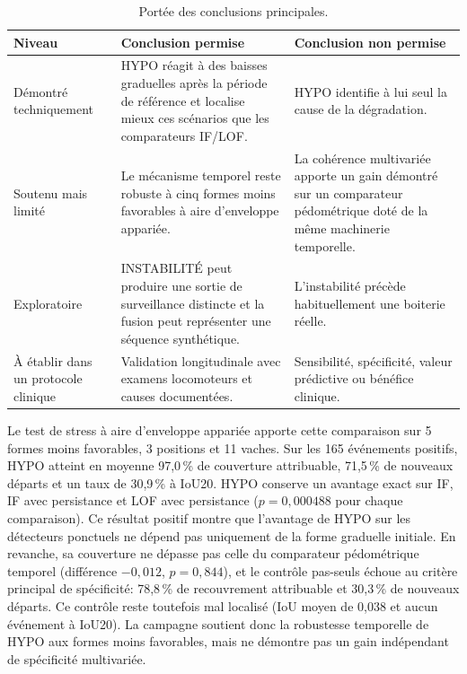 \begin{table}[H]
  \centering
  \caption{Portée des conclusions principales.}
  \label{tab:portee_conclusions}
  \small
  \begin{tabular}{p{}p{}p{}}
    \toprule
    Niveau & Conclusion permise & Conclusion non permise \\
    \midrule
    Démontré techniquement
      & HYPO réagit à des baisses graduelles après la période de référence et localise mieux ces scénarios
        que les comparateurs IF/LOF.
      & HYPO identifie à lui seul la cause de la dégradation. \\
    Soutenu mais limité
      & Le mécanisme temporel reste robuste à cinq formes moins favorables à aire
        d'enveloppe appariée.
      & La cohérence multivariée apporte un gain démontré sur un comparateur pédométrique
        doté de la même machinerie temporelle. \\
    Exploratoire
      & INSTABILITÉ peut produire une sortie de surveillance distincte et la fusion peut
        représenter une séquence synthétique.
      & L'instabilité précède habituellement une boiterie réelle. \\
    À établir dans un protocole clinique
      & Validation longitudinale avec examens locomoteurs et causes documentées.
      & Sensibilité, spécificité, valeur prédictive ou bénéfice clinique. \\
    \bottomrule
  \end{tabular}
\end{table}

Le test de stress à aire d'enveloppe appariée apporte cette comparaison sur 5 formes moins
favorables, 3 positions et 11 vaches. Sur les 165 événements positifs, HYPO atteint en moyenne
97,0\,\% de couverture attribuable, 71,5\,\% de nouveaux départs et un taux de 30,9\,\% à
IoU20. HYPO conserve un avantage exact sur IF, IF avec persistance et LOF avec persistance
($p=0{,}000488$ pour chaque comparaison). Ce résultat positif montre que l'avantage de HYPO
sur les détecteurs ponctuels ne dépend pas uniquement de la forme graduelle initiale. En
revanche, sa couverture ne dépasse pas celle du comparateur pédométrique temporel
(différence $-0{,}012$, $p=0{,}844$), et le contrôle pas-seuls échoue au critère principal de
spécificité: 78,8\,\% de recouvrement attribuable et 30,3\,\% de nouveaux départs. Ce contrôle
reste toutefois mal localisé (IoU moyen de 0,038 et aucun événement à IoU20). La campagne
soutient donc la robustesse temporelle de HYPO aux formes moins favorables, mais ne démontre
pas un gain indépendant de spécificité multivariée.

